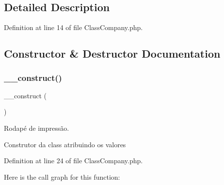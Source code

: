 \subsection{Detailed Description}


Definition at line 14 of file Class\+Company.\+php.



\subsection{Constructor \& Destructor Documentation}
\mbox{\label{class_class_company_a095c5d389db211932136b53f25f39685}} 
\subsubsection{\texorpdfstring{\+\_\+\+\_\+construct()}{\_\_construct()}}
{\footnotesize\ttfamily \+\_\+\+\_\+construct (\begin{DoxyParamCaption}{ }\end{DoxyParamCaption})}



Rodapé de impressão. 

Construtor da class atribuindo os valores 

Definition at line 24 of file Class\+Company.\+php.

Here is the call graph for this function\+:
